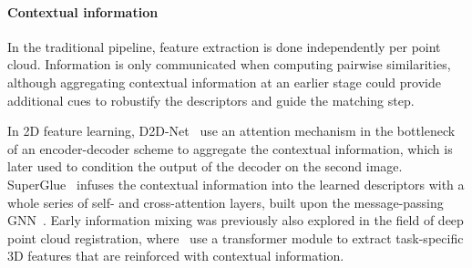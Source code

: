\paragraph{Contextual information} In the traditional pipeline, feature extraction is done independently per point cloud. Information %
is only communicated when computing pairwise similarities, although aggregating contextual information
at an earlier stage could provide additional cues to robustify the descriptors and guide the matching step.

In 2D feature learning, D2D-Net~\cite{wiles2020d2d} use an attention mechanism in the bottleneck of an encoder-decoder scheme to aggregate the contextual information, which is later used to condition the output of the decoder on the second image.
SuperGlue~\cite{sarlin2020superglue} infuses the contextual information into the learned descriptors with a whole series of self- and cross-attention layers, built upon the message-passing GNN~\cite{kipf2016semi}. 
Early information mixing was previously also explored in the field of deep point cloud registration, where~\cite{wang2019dcp, wang2019prnet} use a transformer module to extract task-specific 3D features that are reinforced with contextual information.

